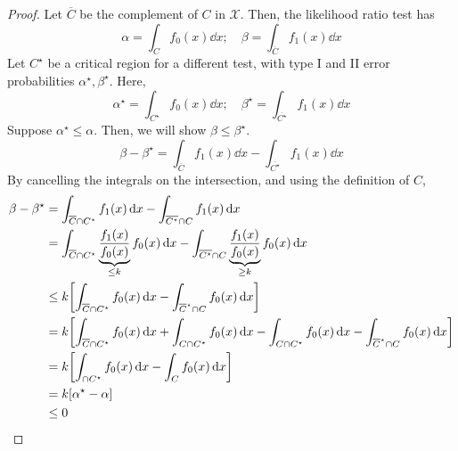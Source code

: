 \begin{proof}
	Let \( \overline C \) be the complement of \( C \) in \( \mathcal X \).
	Then, the likelihood ratio test has
	\[
		\alpha = \int_C f_0(x) \dd{x};\quad \beta = \int_{\overline C} f_1(x) \dd{x}
	\]
	Let \( C^\star \) be a critical region for a different test, with type I and II error probabilities \( \alpha^\star, \beta^\star \).
	Here,
	\[
		\alpha^\star = \int_{C^\star} f_0(x) \dd{x};\quad \beta^\star = \int_{\overline {C^\star}} f_1(x) \dd{x}
	\]
	Suppose \( \alpha^\star \leq \alpha \).
	Then, we will show \( \beta \leq \beta^\star \).
	\[
		\beta - \beta^\star = \int_{\overline C} f_1(x) \dd{x} - \int_{\overline{C^\star}} f_1(x) \dd{x}
	\]
	By cancelling the integrals on the intersection, and using the definition of \( C \),
	\begin{align*}
		\beta - \beta^\star & = \int_{\overline C \cap C^\star} f_1(x) \dd{x} - \int_{\overline{C^\star} \cap C} f_1(x) \dd{x}                                                                                         \\
		                    & = \int_{\overline C \cap C^\star} \underbrace{\frac{f_1(x)}{f_0(x)}}_{\leq k} f_0(x) \dd{x} - \int_{\overline{C^\star} \cap C} \underbrace{\frac{f_1(x)}{f_0(x)}}_{\geq k} f_0(x) \dd{x} \\
		                    & \leq k \qty[ \int_{\overline C \cap C^\star} f_0(x) \dd{x} - \int_{\overline C^\star \cap C} f_0(x) \dd{x} ]                                                                             \\
		                    & = k \qty[ \int_{\overline C \cap C^\star} f_0(x) \dd{x} + \int_{C \cap C^\star} f_0(x) \dd{x} - \int_{C \cap C^\star} f_0(x) \dd{x} - \int_{\overline C^\star \cap C} f_0(x) \dd{x} ]    \\
		                    & = k \qty[ \int_{\cap C^\star} f_0(x) \dd{x} - \int_{C} f_0(x) \dd{x} ]                                                                                                                   \\
		                    & = k \qty[ \alpha^\star - \alpha ]                                                                                                                                                        \\
		                    & \leq 0
	\end{align*}
\end{proof}
